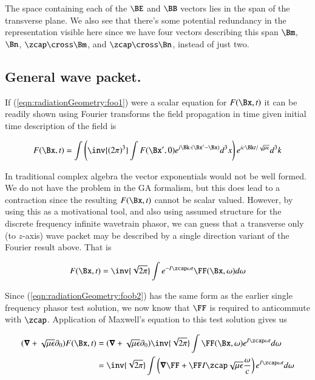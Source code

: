 The space containing each of the $\BE$ and $\BB$ vectors lies in the span of the transverse plane.  We also see that there's some potential redundancy in the representation visible here since we have four vectors describing this span $\Bm$, $\Bn$, $\zcap \cross \Bm$, and $\zcap \cross \Bn$, instead of just two.

\subsection{General wave packet.}

If (\ref{eqn:radiationGeometry:foo1}) were a scalar equation for $F(\Bx,t)$ it can be readily shown using Fourier transforms the field propagation in time given initial time description of the field is 

\begin{align}\label{eqn:radiationGeometry:foob1}
F(\Bx, t) = \int \left( \inv{(2\pi)^3} \int F(\Bx', 0) e^{i\Bk \cdot (\Bx' -\Bx)} d^3 x \right) e^{i c \Bk t/ \sqrt{\mu\epsilon}} d^3 k
\end{align}

In traditional complex algebra the vector exponentials would not be well formed.  We do not have the problem in the GA formalism, but this does lead to a contraction since the resulting $F(\Bx,t)$ cannot be scalar valued.  However, by using this as a motivational tool, and 
also using assumed structure for the discrete frequency infinite wavetrain phasor, we can guess that a transverse only (to $z$-axis) wave packet may be described by a single direction variant of the Fourier result above.  That is

\begin{align}\label{eqn:radiationGeometry:foob2}
F(\Bx, t) = 
\inv{\sqrt{2\pi}} \int 
e^{-I \zcap \omega t} 
\FF(\Bx, \omega)
d\omega
\end{align}

Since (\ref{eqn:radiationGeometry:foob2}) has the same form as the earlier single frequency phasor test solution, we now know that $\FF$ is required to anticommute with $\zcap$.  Application of Maxwell's equation to this test solution gives us

\begin{align*}
(\spacegrad +\sqrt{\mu\epsilon} \partial_0) F(\Bx,t) &=
(\spacegrad +\sqrt{\mu\epsilon} \partial_0) 
\inv{\sqrt{2\pi}} \int 
\FF(\Bx, \omega)
e^{I \zcap \omega t} 
d\omega \\
&=
\inv{\sqrt{2\pi}}\int
\left(\spacegrad \FF + \FF I \zcap \sqrt{\mu\epsilon} \frac{\omega}{c}\right) 
e^{I \zcap \omega t} 
d\omega
\end{align*}

